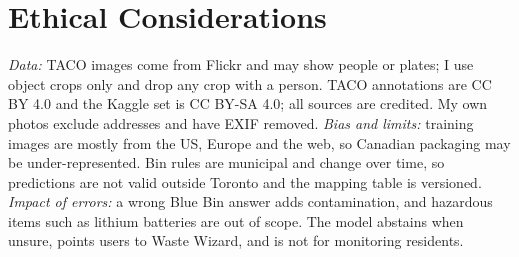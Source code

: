\documentclass[final]{article}
\begin{document}
\section*{Ethical Considerations}
\emph{Data:} TACO images come from Flickr and may show people or plates; I use object crops only and drop any crop with a person. TACO annotations are CC BY 4.0 and the Kaggle set is CC BY-SA 4.0; all sources are credited. My own photos exclude addresses and have EXIF removed. \emph{Bias and limits:} training images are mostly from the US, Europe and the web, so Canadian packaging may be under-represented. Bin rules are municipal and change over time, so predictions are not valid outside Toronto and the mapping table is versioned. \emph{Impact of errors:} a wrong Blue Bin answer adds contamination, and hazardous items such as lithium batteries are out of scope. The model abstains when unsure, points users to Waste Wizard, and is not for monitoring residents.

\newpage


\end{document}
